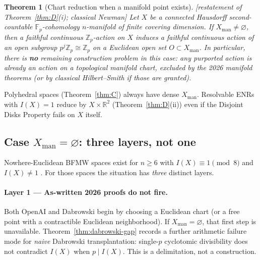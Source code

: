 \documentclass[11pt]{article}
\newtheorem{theorem}{Theorem}[section]
\theoremstyle{definition}
\newcommand{\status}[1]{\textit{\textcolor{black!70}{[#1]}}}
\begin{document}
\begin{theorem}[Chart reduction when a manifold point exists]
\label{thm:settled-chart}
\status{restatement of Theorem~\ref{thm:D}(i); classical Newman}
Let $X$ be a connected Hausdorff second-countable $\mathbb{F}_p$-cohomology
$n$-manifold of finite covering dimension.  If
$X_{\mathrm{man}}\neq\varnothing$, then a faithful continuous
$\mathbb{Z}_p$-action on $X$ induces a faithful continuous action of an open
subgroup $p^j\mathbb{Z}_p\cong\mathbb{Z}_p$ on a Euclidean open set
$O\subset X_{\mathrm{man}}$.  In particular, there is \textbf{no} remaining
construction problem in this case: any purported action is already an action
on a topological manifold chart, excluded by the 2026 manifold theorems (or by
classical Hilbert--Smith if those are granted).
\end{theorem}

Polyhedral spaces (Theorem~\ref{thm:C}) always have dense
$X_{\mathrm{man}}$.  Resolvable ENRs with $I(X)=1$ reduce by
$X\times\mathbb{R}^2$ (Theorem~\ref{thm:D}(ii)) even if the Disjoint Disks
Property fails on $X$ itself.

\subsection{Case $X_{\mathrm{man}}=\varnothing$: three layers, not one}
\label{sec:settled-empty}

Nowhere-Euclidean BFMW spaces exist for $n\ge 6$ with $I(X)\equiv 1\pmod{8}$
and $I(X)\neq 1$ \cite{bfmw1996}.  For those spaces the situation has
\emph{three} distinct layers.

\paragraph{Layer 1 --- As-written 2026 proofs do not fire.}
Both OpenAI and Dabrowski begin by choosing a Euclidean chart (or a free point
with a contractible Euclidean neighborhood).  If
$X_{\mathrm{man}}=\varnothing$, that first step is unavailable.
Theorem~\ref{thm:dabrowski-gap} records a further arithmetic failure mode for
\emph{naive} Dabrowski transplantation: single-$p$ cyclotomic divisibility does
not contradict $I(X)$ when $p\mid I(X)$.  This is a delimitation, not a
construction.
\end{document}
